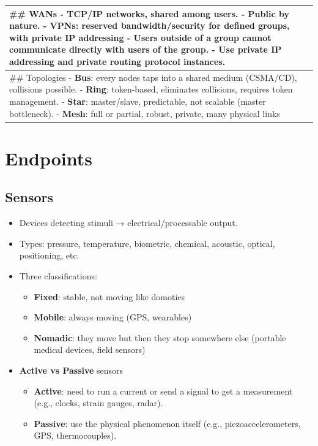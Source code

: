 \documentclass[a4paper, 12pt]{book} %
\begin{document}
\begin{longtable}[]{@{}
  >{\raggedright\arraybackslash}p{}@{}}
\toprule\noalign{}
\begin{minipage}[b]{\linewidth}\raggedright
\#\# WANs - TCP/IP networks, shared among users. - Public by nature. -
\textbf{VPNs}: reserved bandwidth/security for defined groups, with
private IP addressing - Users outside of a group cannot communicate
directly with users of the group. - Use private IP addressing and
private routing protocol instances.
\end{minipage} \\
\midrule\noalign{}
\endhead
\bottomrule\noalign{}
\endlastfoot
\#\# Topologies - \textbf{Bus}: every nodes taps into a shared medium
(CSMA/CD), collisions possible. - \textbf{Ring}: token-based, eliminates
collisions, requires token management. - \textbf{Star}: master/slave,
predictable, not scalable (master bottleneck). - \textbf{Mesh}: full or
partial, robust, private, many physical links \\
\end{longtable}

\chapter{Endpoints}\label{endpoints}

\section{Sensors}\label{sensors}

\begin{itemize}
\tightlist
\item
  Devices detecting stimuli → electrical/processable output.
\item
  Types: pressure, temperature, biometric, chemical, acoustic, optical,
  positioning, etc.
\item
  Three classifications:

  \begin{itemize}
  \tightlist
  \item
    \textbf{Fixed}: stable, not moving like domotics
  \item
    \textbf{Mobile}: always moving (GPS, wearables)
  \item
    \textbf{Nomadic}: they move but then they stop somewhere else
    (portable medical devices, field sensors)
  \end{itemize}
\item
  \textbf{Active vs Passive} sensors

  \begin{itemize}
  \tightlist
  \item
    \textbf{Active}: need to run a current or send a signal to get a
    measurement (e.g., clocks, strain gauges, radar).
  \item
    \textbf{Passive}: use the physical phenomenon itself (e.g.,
    piezoaccelerometers, GPS, thermocouples).
  \end{itemize}
\end{itemize}
\end{document}
